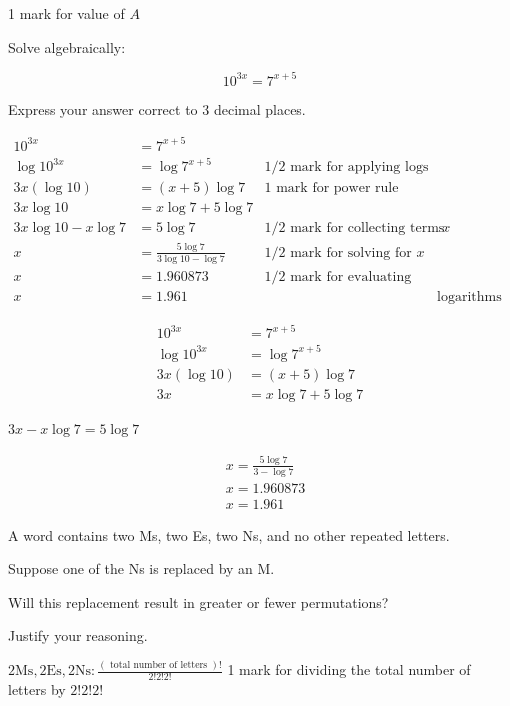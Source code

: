 \documentclass[12pt,addpoints]{exam}
\begin{document}
\begin{questions}
\begin{solution}
1 mark for value of $A$
\end{solution}

\question[3]
Solve algebraically:

$$
10^{3 x}=7^{x+5}
$$

Express your answer correct to 3 decimal places.

\begin{solution}
$$
\begin{array}{rlrl}
10^{3 x} & =7^{x+5} & \\
\log 10^{3 x} & =\log 7^{x+5} & 1 / 2 \text { mark for applying logs } \\
3 x(\log 10) & =(x+5) \log 7 & 1 \text { mark for power rule } & \\
3 x \log 10 & =x \log 7+5 \log 7 & & \\
3 x \log 10-x \log 7 & =5 \log 7 & 1 / 2 \text { mark for collecting terms with } x & \\
x & =\frac{5 \log 7}{3 \log 10-\log 7} & 1 / 2 \text { mark for solving for } x \\
x & =1.960873 & 1 / 2 \text { mark for evaluating quotient of } \\
x & =1.961 & & \text { logarithms }
\end{array}
$$


$$
\begin{aligned}
10^{3 x} & =7^{x+5} \\
\log 10^{3 x} & =\log 7^{x+5} \\
3 x(\log 10) & =(x+5) \log 7 \\
3 x & =x \log 7+5 \log 7
\end{aligned}
$$

$3 x-x \log 7=5 \log 7$

$$
\begin{aligned}
& x=\frac{5 \log 7}{3-\log 7} \\
& x=1.960873 \\
& x=1.961
\end{aligned}
$$
\end{solution}

\question[2]
A word contains two Ms, two Es, two Ns, and no other repeated letters.

Suppose one of the Ns is replaced by an M.

Will this replacement result in greater or fewer permutations?

Justify your reasoning.

\begin{solution}
$2 \mathrm{Ms}, 2 \mathrm{Es}, 2 \mathrm{Ns}: \frac{(\text { total number of letters })!}{2!2!2!}$ 1 mark for dividing the total number of letters by $2!2!2!$


\end{solution}
\end{questions}
\end{document}

